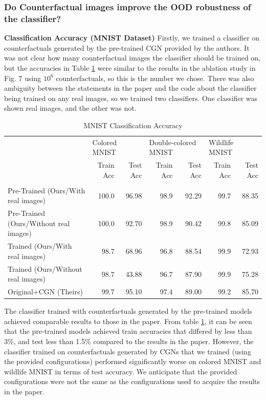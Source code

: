 \subsubsection{Do Counterfactual images improve the OOD robustness of the classifier?}
\textbf{Classification Accuracy (MNIST Dataset)}
Firstly, we trained a classifier on counterfactuals generated by the pre-trained CGN provided by the authors. It was not clear how many counterfactual images the classifier should be trained on, but the accuracies in Table \ref{table:mnist-classification} were similar to the results in the ablation study in Fig. 7 using $10^6$ counterfactuals, so this is the number we chose. There was also ambiguity between the statements in the paper and the code about the classifier being trained on any real images, so we trained two classifiers. One classifier was shown real images, and the other was not. 
\\
\begin{table}[h]
\centering
\tiny
\begin{tabular}{lrrrrrr}
\toprule
{} & \multicolumn{2}{l}{Colored MNIST} & \multicolumn{2}{l}{Double-colored MNIST} & \multicolumn{2}{l}{Wildlife MNIST} \\
{} &     Train Acc & Test Acc &            Train Acc & Test Acc &      Train Acc & Test Acc \\
                                       &               &          &                      &          &                &          \\
\midrule
Pre-Trained (Ours/With real images)    &         100.0 &    96.98 &                 98.9 &    92.29 &           99.7 &    88.35 \\
Pre-Trained (Ours/Without real images) &         100.0 &    92.70 &                 98.9 &    90.42 &           99.8 &    85.09 \\
Trained (Ours/With real images)        &          98.7 &    68.96 &                 96.8 &    88.54 &           99.9 &    72.93 \\
Trained (Ours/Without real images)     &          98.7 &    43.88 &                 96.7 &    87.90 &           99.9 &    75.28 \\
Original+CGN (Theirs)                               &          99.7 &    95.10 &                 97.4 &    89.00 &           99.2 &    85.70 \\
\bottomrule
\end{tabular}
\caption {MNIST Classification Accuracy}
\label{table:mnist-classification}
\end{table}
The classifier trained with counterfactuals generated by the pre-trained models achieved comparable results to those in the paper. From table \ref{table:mnist-classification}, it can be seen that the pre-trained models achieved train accuracies that differed by less than 3\%, and test less than 1.5\% compared to the results in the paper. However, the classifier trained on counterfactuals generated by CGNs that we trained (using the provided configurations) performed significantly worse on colored MNIST and wildlife MNIST in terms of test accuracy. We anticipate that the provided configurations were not the same as the configurations used to acquire the results in the paper. 


